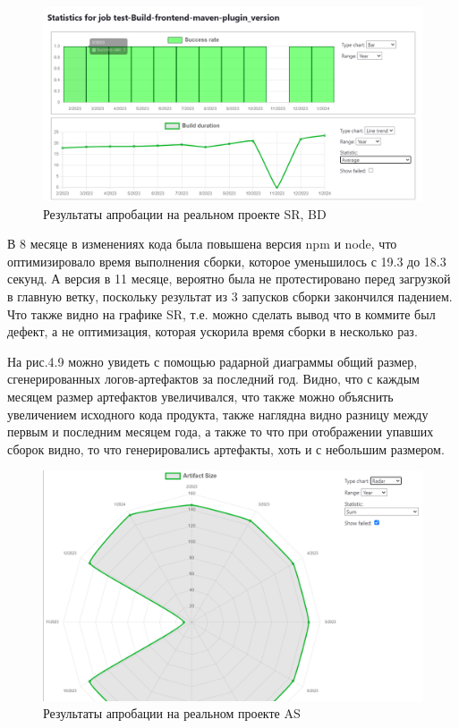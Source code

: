  \begin{figure}[ht!] 
	\center
	\includegraphics [scale=0.47] {my_folder/images//reares1}
	\caption{Результаты апробации на реальном проекте SR, BD} 
	\label{fig:reares1}  
\end{figure}

В 8 месяце в изменениях кода была повышена версия npm и node, что оптимизировало время выполнения сборки, которое уменьшилось с 19.3 до 18.3 секунд. А версия в 11 месяце, вероятно была не протестировано перед загрузкой в главную ветку, поскольку результат из 3 запусков сборки закончился падением. Что также видно на графике SR, т.е. можно сделать вывод что в коммите был дефект, а не оптимизация, которая ускорила время сборки в несколько раз.

На рис.4.9 можно увидеть с помощью радарной диаграммы общий размер, сгенерированных логов-артефактов за последний год. Видно, что с каждым месяцем размер артефактов увеличивался, что также можно объяснить увеличением исходного кода продукта, также наглядна видно разницу между первым и последним месяцем года, а также то что при отображении упавших сборок видно, то что генерировались артефакты, хоть и с небольшим размером.

 \begin{figure}[ht!] 
	\center
	\includegraphics [scale=0.47] {my_folder/images//realres2}
	\caption{Результаты апробации на реальном проекте AS} 
	\label{fig:realres2}  
\end{figure}

